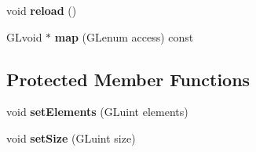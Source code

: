 \begin{DoxyCompactItemize}
\item 
\hypertarget{classfillwave_1_1core_1_1Buffer_afcd11fbdf69f3056ecfcd00cfe2f3966}{}void {\bfseries reload} ()\label{classfillwave_1_1core_1_1Buffer_afcd11fbdf69f3056ecfcd00cfe2f3966}

\item 
\hypertarget{classfillwave_1_1core_1_1Buffer_af4cde11aea152f62a65499d06d66053d}{}G\+Lvoid $\ast$ {\bfseries map} (G\+Lenum access) const \label{classfillwave_1_1core_1_1Buffer_af4cde11aea152f62a65499d06d66053d}

\end{DoxyCompactItemize}
\subsection*{Protected Member Functions}
\begin{DoxyCompactItemize}
\item 
\hypertarget{classfillwave_1_1core_1_1Buffer_a470d1b51f2b2d2d6d8a5dce29358c1f9}{}void {\bfseries set\+Elements} (G\+Luint elements)\label{classfillwave_1_1core_1_1Buffer_a470d1b51f2b2d2d6d8a5dce29358c1f9}

\item 
\hypertarget{classfillwave_1_1core_1_1Buffer_a890a440f8ea28e984a9bdfa7949ef427}{}void {\bfseries set\+Size} (G\+Luint size)\label{classfillwave_1_1core_1_1Buffer_a890a440f8ea28e984a9bdfa7949ef427}

\end{DoxyCompactItemize}
